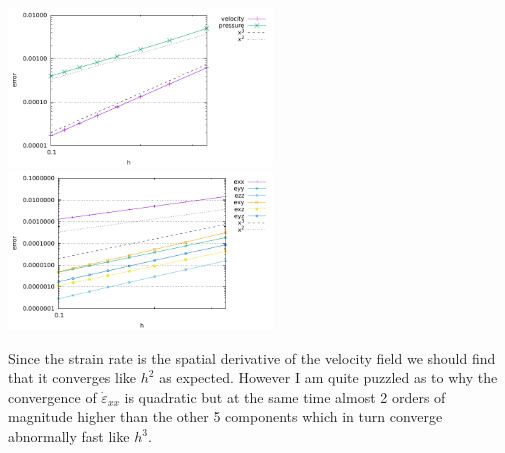 \begin{center}
\includegraphics[width=7cm]{python_codes/fieldstone_17/results_isoviscous/errors.pdf}
\includegraphics[width=7cm]{python_codes/fieldstone_17/results_isoviscous/errors_sr.pdf}
\end{center}
Since the strain rate is the spatial derivative of the velocity field we should 
find that it converges like $h^2$ as expected. However I am quite puzzled as to why the convergence 
of $\dot{\varepsilon}_{xx}$ is quadratic 
but at the same time almost 2 orders of magnitude higher than the other 5 components which in turn 
converge abnormally fast like $h^3$.


